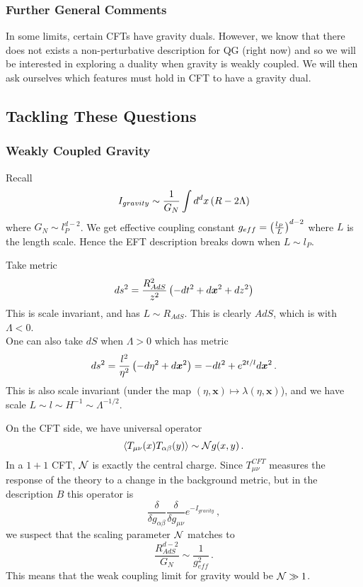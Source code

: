 \documentclass{article}
\begin{document}
\subsubsection{Further General Comments}
In some limits, certain CFTs have gravity duals. However, we know that there does not exists a non-perturbative description for QG (right now) and so we will be interested in exploring a duality when gravity is weakly coupled. We will then ask ourselves which features must hold in CFT to have a gravity dual.

\subsection{Tackling These Questions}
\subsubsection{Weakly Coupled Gravity} 
Recall 
\[
I_{gravity} \sim \frac{1}{G_N} \int d^dx \left( R - 2\Lambda \right)
\]
where $G_N \sim l_P^{d-2}$. We get effective coupling constant $g_{eff} = \left( \frac{l_P}{L} \right)^{d-2}$ where $L$ is the length scale. Hence the EFT description breaks down when $L \sim l_P$. 

\begin{example}
	Take metric 
	\[
	ds^2 = \frac{R_{AdS}^2}{z^2} \left( -dt^2 + d\bm{x}^2 + dz^2 \right)
	\]
	This is scale invariant, and has $L \sim R_{AdS}$. This is clearly $AdS$, which is with $\Lambda < 0$. \\
	One can also take $dS$ when $\Lambda >0$ which has metric 
	\[
	ds^2 = \frac{l^2}{\eta^2} \left( -d\eta^2 + d\bm{x}^2 \right) = -dt^2 + e^{2t/l} d\bm{x}^2 \, .
	\]
	This is also scale invariant (under the map $(\eta, \bm{x}) \mapsto \lambda (\eta, \bm{x})$), and we have scale $L \sim l \sim H^{-1} \sim \Lambda^{-1/2}$. 
\end{example}
 
On the CFT side, we have universal operator 
\[
\left\langle T_{\mu\nu}(x)T_{\alpha \beta}(y) \right\rangle \sim \mathcal{N} g(x,y) \, .
\]
In a $1+1$ CFT, $\mathcal{N}$ is exactly the central charge. Since $T_{\mu\nu}^{CFT}$ measures the response of the theory to a change in the background metric, but in the description $B$ this operator is 
\[
\frac{\delta}{\delta g_{\alpha \beta}} \frac{\delta}{\delta g_{\mu\nu}} e^{-I_{gravity}} \, ,
\]
we suspect that the scaling parameter $\mathcal{N}$ matches to 
\[
\frac{R_{AdS}^{d-2}}{G_N} \sim \frac{1}{g_{eff}^2} \, .
\]
This means that the weak coupling limit for gravity would be $\mathcal{N} \gg 1$. 
\end{document}
